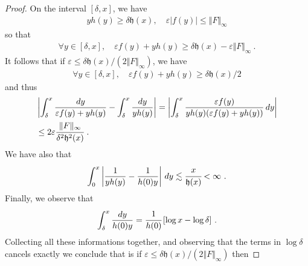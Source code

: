 \documentclass[reqno, 12pt, a4paper]{amsart}
\theoremstyle{plain}
\theoremstyle{definition}
\begin{document}
\begin{proof}
\bigskip

On the interval $[\delta,x]$, we have
\begin{equation}
\begin{split}
y h(y) \ge \delta {\mathfrak h}(x), \quad \varepsilon |f(y)| \le \Vert F\Vert_{\infty} 
\end{split}
\end{equation}
so that 
\begin{equation}
\begin{split}
\forall y \in [\delta, x], \quad \varepsilon f(y)+yh(y) \ge \delta {\mathfrak h}(x) - \varepsilon \Vert F \Vert_\infty \ . 
\end{split}
\end{equation}
It follows that if $\varepsilon \le \delta {\mathfrak h}(x)/ (2 \Vert F \Vert_{\infty})$, we have 
\begin{equation}
\begin{split}
\forall y \in [\delta, x], \quad \varepsilon f(y)+yh(y) \ge \delta {\mathfrak h}(x) /2 
\end{split}
\end{equation}
and thus
\begin{equation}
\begin{split}
&\left\vert \int_{\delta}^x  \frac{dy}{\varepsilon f(y) +y h(y)} - \int_\delta^x \frac{dy}{y h(y)}    \right\vert =\left\vert \int_{\delta}^x  \frac{\varepsilon f(y)}{ y h(y) (\varepsilon f(y) +y h(y))} \, dy    \right\vert \\
&\le 2 \varepsilon \cfrac{ \Vert F\Vert_{\infty}}{\delta^2 {\mathfrak h}^2 (x)}  \ .
\end{split}
\end{equation}
We have also that
\begin{equation}
\begin{split}
\int_{0}^x \left\vert \frac{1}{y h(y)} -\frac{1}{h(0)y} \right\vert \, dy \lesssim \cfrac{x}{{\mathfrak h}(x)} < \infty \ .
\end{split}
\end{equation}
Finally, we observe that 
\begin{equation}
\begin{split}
\int_{\delta}^x \frac{dy}{h(0)y} = \cfrac{1}{h(0)} \, [ \log x - \log \delta] \ . 
\end{split}
\end{equation}
Collecting all these informations together, and observing that the terms in $\log \delta$ cancels exactly we conclude that is  if $\varepsilon \le \delta {\mathfrak h}(x)/ (2 \Vert F \Vert_{\infty})$ then 

\end{proof}
\end{document}
